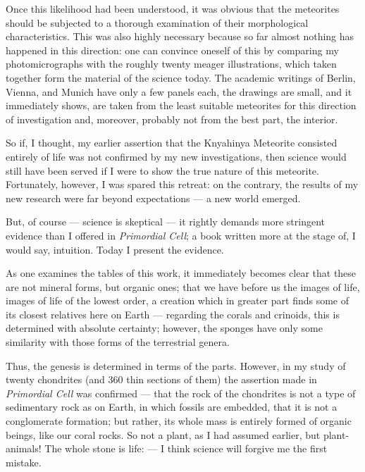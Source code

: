 \documentclass[a4paper, 12pt, oneside]{article}
\begin{document}
Once this likelihood had been understood, it was obvious that the meteorites should be subjected to a thorough examination of their morphological characteristics. This was also highly necessary because so far almost nothing has happened in this direction: one can convince oneself of this by comparing my photomicrographs with the roughly twenty meager illustrations, which taken together form the material of the science today. The academic writings of Berlin, Vienna, and Munich have only a few panels each, the drawings are small, and it immediately shows, are taken from the least suitable meteorites for this direction of investigation and, moreover, probably not from the best part, the interior.

So if, I thought, my earlier assertion that the Knyahinya Meteorite consisted entirely of life was not confirmed by my new investigations, then science would still have been served if I were to show the true nature of this meteorite. Fortunately, however, I was spared this retreat: on the contrary, the results of my new research were far beyond expectations --- a new world emerged.

But, of course --- science is skeptical --- it rightly demands more stringent evidence than I offered in \emph{Primordial Cell}; a book written more at the stage of, I would say, intuition. Today I present the evidence.

As one examines the tables of this work, it immediately becomes clear that these are not mineral forms, but organic ones; that we have before us the images of life, images of life of the lowest order, a creation which in greater part finds some of its closest relatives here on Earth --- regarding the corals and crinoids, this is determined with absolute certainty; however, the sponges have only some similarity with those forms of the terrestrial genera.

Thus, the genesis is determined in terms of the parts. However, in my study of twenty chondrites (and 360 thin sections of them) the assertion made in \emph{Primordial Cell} was confirmed --- that the rock of the chondrites is not a type of sedimentary rock as on Earth, in which fossils are embedded, that it is not a conglomerate formation; but rather, its whole mass is entirely formed of organic beings, like our coral rocks. So not a plant, as I had assumed earlier, but plant-animals! The whole stone is life: --- I think science will forgive me the first mistake.
\end{document}
